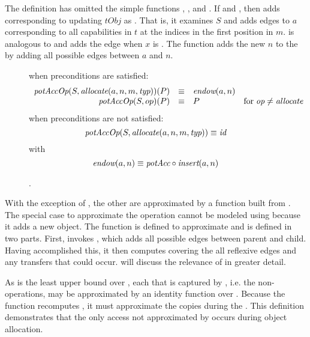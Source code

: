 The definition has omitted the simple functions \NMedgeTx{}, \NMreply{}, and \NMinsert{}.
If  and , then  adds \TMaccessEdges{} corresponding to updating \(tObj\) as .
That is, it examines \(S\) and adds edges to \(a\) corresponding to all capabilities in \(t\) at the indices in the first position in \(m\).
\NMreply{} is analogous to \NMreplyCap{} and adds the edge  when \(x\) is .
The  function adds the new \TMobj{} \(n\) to the \TMaccessGraph{} by adding all possible edges between \(a\) and \(n\).

\begin{figure}
  when preconditions are satisfied:
  \[
  \begin{array}{rclr}
  \textit{potAccOp}(S,\textit{allocate}(a,n,m,\textit{typ}))(P) & \equiv & \textit{endow}(a,n) &\\
  \textit{potAccOp}(S,op)(P) & \equiv & P & \text{for} \; \textit{op} \neq \textit{allocate}
  \end{array}
  \]
  when preconditions are not satisfied:
  \[
  \textit{potAccOp}(S,\textit{allocate}(a,n,m,\textit{typ})) \equiv \textit{id}
  \]
  with
  \[
  \textit{endow}(a,n) \equiv \textit{potAcc}{} \circ \textit{insert}(a,n)
  \]
\caption{\xmakefirstuc{\TMpotAccOp}. \label{fig:sketch:potAccOp}}
\end{figure}

With the exception of \NMcreate{}, the other \TMops{} are approximated by a function built from \NMpotTransfer{}.
The special case to approximate the \NMcreate{} operation cannot be modeled using \NMpotTransfer{} because it adds a new object.
The \NMendow{} function is defined to approximate \NMcreate{} and is defined in two parts.
First, \NMendow{} invokes \NMinsert{}, which adds all possible edges between parent and child.
Having accomplished this, it then computes \NMpotAcc{} covering the all reflexive edges and any transfers that could occur.
 will discuss the relevance of \NMendow{} in greater detail.

As \TMpotAcc{} is the least upper bound over \NMpotTransfer{}, each \NMdirAccOp{} that is captured by \TMpotTransfer{}, i.e. the non-\TMallocate{} operations, may be approximated by an identity function over \TMpotAcc{}.
Because the \NMendow{} function recomputes \TMpotAcc{}, it must approximate the \TMcap{} copies during the \NMcreate{} \TMop{}.
This definition demonstrates that the only access not approximated by \TMpotAcc{} occurs during object allocation.

